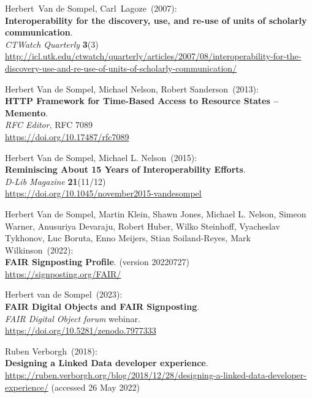 \begin{thebibliography}{9}
Herbert~Van de Sompel, Carl~Lagoze~(2007): \\
\textbf{Interoperability for the discovery, use, and re-use of units of
scholarly communication}.\\
\emph{CTWatch Quarterly} \textbf{3}(3)\\
\url{http://icl.utk.edu/ctwatch/quarterly/articles/2007/08/interoperability-for-the-discovery-use-and-re-use-of-units-of-scholarly-communication/}

Herbert Van de Sompel, Michael Nelson, Robert Sanderson~(2013): \\
\textbf{{HTTP Framework} for {Time-Based Access} to {Resource States} --
{Memento}}.\\
\emph{RFC Editor}, RFC 7089\\
\url{https://doi.org/10.17487/rfc7089}

Herbert Van de Sompel, Michael L. Nelson~(2015): \\
\textbf{Reminiscing About 15 Years of Interoperability Efforts}.\\
\emph{D-Lib Magazine} \textbf{21}(11/12) \\
\url{https://doi.org/10.1045/november2015-vandesompel}

Herbert Van de Sompel, Martin Klein, Shawn
Jones, Michael L. Nelson, Simeon Warner, Anusuriya Devaraju, Robert
Huber, Wilko Steinhoff, Vyacheslav Tykhonov, Luc Boruta, Enno Meijers,
Stian Soiland-Reyes, Mark Wilkinson~(2022): \\
\textbf{FAIR Signposting Profile}. (version 20220727)\\
\url{https://signposting.org/FAIR/}

Herbert van de Sompel~(2023): \\
\textbf{FAIR Digital Objects and FAIR Signposting}.\\
\emph{FAIR Digital Object forum} webinar.\\
\url{https://doi.org/10.5281/zenodo.7977333}

Ruben Verborgh~(2018): \\
\textbf{Designing a {Linked Data} developer experience}.\\
\url{https://ruben.verborgh.org/blog/2018/12/28/designing-a-linked-data-developer-experience/}
(accessed 26 May 2022)


\end{thebibliography}
